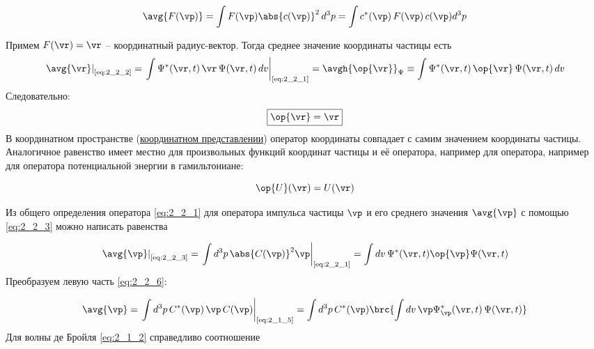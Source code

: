 \begin{equation}
\label{eq:2_2_3}
\avg{F(\vp)} = \int F(\vp) \abs{c(\vp)}^2 \, d^3 p = \int c^*(\vp) \, F(\vp) \, c(\vp) d^3 p 
\end{equation}

Примем $F(\vr) = \vr$ -- координатный радиус-вектор. Тогда среднее значение координаты частицы есть
$$
\left. \avg{\vr} \right|_{\text{\eqref{eq:2_2_2}}} = 
  \left. \int \Psi^*(\vr, t) \, \vr \, \Psi(\vr,t) \, dv \right|_{\text{\eqref{eq:2_2_1}}} =
  \avgh{\op{\vr}}_\Psi \equiv \int \Psi^*(\vr,t) \, \op{\vr} \, \Psi(\vr,t) \, dv
$$%
%
Следовательно:
\begin{equation}
\label{eq:2_2_4}
\boxed{\op{\vr} = \vr}
\end{equation}%
%
В координатном пространстве (\underline{координатном представлении}) оператор координаты совпадает с самим значением координаты частицы. Аналогичное равенство имеет местно для произвольных функций координат частицы и её оператора, например для оператора, например для оператора потенциальной энергии в гамильтониане:

\begin{equation}
\label{eq:2_2_5}
\op{U}(\vr) = U(\vr)
\end{equation}

Из общего определения оператора \eqref{eq:2_2_1} для оператора импульса частицы $\vp$ и его среднего значения $\avg{\vp}$ с помощью \eqref{eq:2_2_3} можно написать равенства

\begin{equation}
\label{eq:2_2_6}
\left. \avg{\vp} \right|_{\text{\eqref{eq:2_2_3}}} = 
  \left. \int d^3 p \, \abs{C(\vp)}^2 \vp \right|_{\text{\eqref{eq:2_2_1}}} = 
  \int dv \, \Psi^*(\vr,t) \op{\vp} \Psi(\vr,t)
\end{equation}%
%
Преобразуем левую часть \eqref{eq:2_2_6}:

$$
\avg{\vp} = \left. \int d^3 p \, C^*(\vp) \, \vp \, C(\vp) \right|_{\text{\eqref{eq:2_1_5}}} =
  \int d^3 p \, C^*(\vp) \brc{ \int dv \, \vp \Psi_{\vp}^*(\vr,t) \, \Psi(\vr,t) }
$$%
%
Для волны де Бройля \eqref{eq:2_1_2} справедливо соотношение

